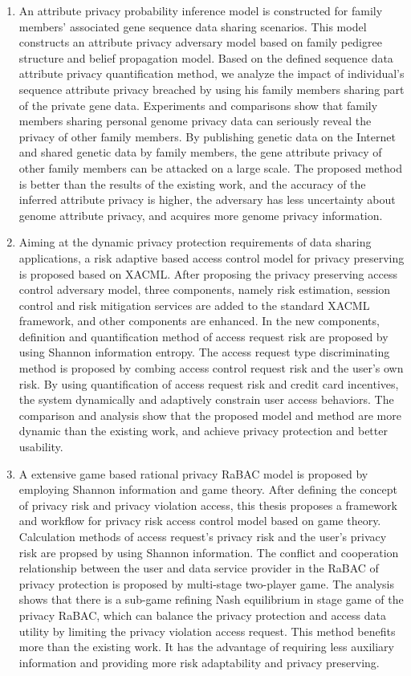 \documentclass[pdftex,notypeinfo,twoside,openany,UTF8,fntef]{CASthesis}
\theoremstyle{THrm}{
	\newtheorem{question}{Question}[section]
	\newtheorem{property}{性质}[section]
	\newtheorem{assumption}{假设}[section]
	\newtheorem{claim}[lemma]{断言}
	
}
\begin{document}
\begin{enumerate}
	\item 	
	An attribute privacy probability inference model is constructed for family members' associated gene sequence data sharing scenarios. This model constructs an attribute privacy adversary model based on family pedigree structure and belief propagation model. Based on the defined sequence data attribute privacy quantification method, we analyze the impact of individual's sequence attribute privacy breached by using his family members sharing part of the private gene data. Experiments and comparisons show that family members sharing personal genome privacy data can seriously reveal the privacy of other family members. By publishing genetic data on the Internet and shared genetic data by family members, the gene attribute privacy of other family members can be attacked on a large scale. The proposed method is better than the results of the existing work, and the accuracy of the inferred attribute privacy is higher, the adversary has less uncertainty about genome attribute privacy, and acquires more genome privacy information.
	
	\item 	
	Aiming at the dynamic privacy protection requirements of data sharing applications, a risk adaptive based access control model for privacy preserving is proposed based on XACML. After proposing the privacy preserving access control adversary model, three components, namely risk estimation, session control and risk mitigation services are added to the standard XACML framework, and other components are enhanced. In the new components, definition and quantification method of access request risk are proposed by using Shannon information entropy.  The access request type discriminating method is proposed by combing access control request risk  and the user's own risk. By using quantification of access request risk and  credit card incentives, the system dynamically and adaptively constrain user access behaviors. The comparison and analysis show that the proposed model and method are more dynamic than the existing work, and achieve privacy protection and better usability.
	
	\item 		
	A extensive game based rational privacy RaBAC model is proposed by employing Shannon information and game theory. After defining the concept of privacy risk and privacy violation access, this thesis proposes a framework and workflow for privacy risk access control model based on game theory. Calculation methods of access request's privacy risk and  the user's privacy risk are propsed by using Shannon information.
	The conflict and cooperation relationship between the user and data service provider in the RaBAC of privacy protection is proposed by multi-stage two-player game. The analysis shows that there is a sub-game refining Nash equilibrium in stage game of the privacy RaBAC, which can balance the privacy protection and access data utility by limiting the privacy violation access request. This method benefits more than the existing work. It has the advantage of requiring less auxiliary information and providing more risk adaptability and privacy preserving.
	

\end{enumerate}
\end{document}
